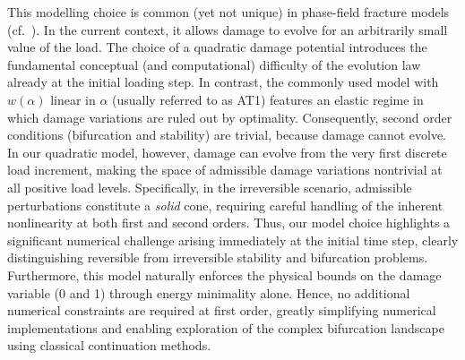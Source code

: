 \documentclass[10pt]{article}
\begin{document}
This modelling choice is common (yet not unique) in phase-field fracture models (cf.~\cite{Bourdin2000-pc,Miehe2010-sj,Miehe2010-ja}). In the current context, it allows damage to evolve for an arbitrarily small value of the load.
    {
        The choice of a quadratic damage potential introduces the fundamental conceptual (and computational) difficulty of the evolution law already at the initial loading step.
        In contrast, the commonly used model with $w(\alpha)$ linear in $\alpha$ (usually referred to as AT1)  features an elastic regime in which damage variations are ruled out by optimality.
        Consequently, second order conditions (bifurcation and stability) are trivial, because damage cannot evolve.
        In our quadratic model, however, damage can evolve from the very first discrete load increment, making the space of admissible damage variations nontrivial at all positive load levels. Specifically, in the irreversible scenario, admissible perturbations constitute a \emph{solid} cone, requiring careful handling of the inherent nonlinearity at both first and second orders. Thus, our model choice highlights a significant numerical challenge arising immediately at the initial time step, clearly distinguishing reversible from irreversible stability and bifurcation problems.
        Furthermore, this model naturally enforces the physical bounds on the damage variable (0 and 1) through energy minimality alone. Hence, no additional numerical constraints are required at first order, greatly simplifying numerical implementations and enabling exploration of the complex bifurcation landscape using classical continuation methods.
    }
\end{document}
